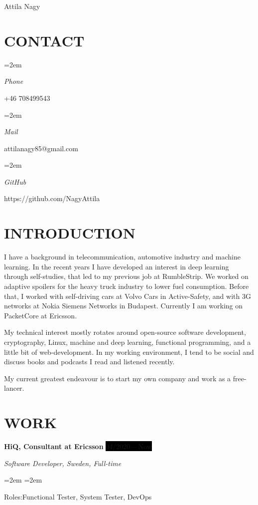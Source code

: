 \documentclass[paper=a4,fontsize=11pt]{scrartcl}	 			%
\newlength{\spacebox}
\newcommand{\MyName}[1]{
		\Huge \usefont{OT1}{phv}{b}{n} \hfill #1 		%
		\par \normalsize \normalfont}
\newcommand{\MySlogan}[1]{
		\large \usefont{OT1}{phv}{m}{n}\hfill \textit{#1} %
		\par \normalsize \normalfont}
\newcommand{\NewPart}[1]{\section*{\uppercase{#1}}}
\newcommand{\PersonalEntry}[2]{
		\noindent\hangindent=2em\hangafter=0 		%
		\parbox{\spacebox}{						%
		\textit{#1}}								%
		\hspace{1.5em} #2 \par}					%
\newcommand{\SkillsEntry}[2]{						%
		\noindent\hangindent=2em\hangafter=0 		%
		\parbox{\spacebox}{						%
		\textit{#1}}								%
		\hspace{1.5em} #2 \par}					%
\newcommand{\EducationEntry}[4]{
		\noindent \textbf{#1} \par 					%
		\noindent \textit{#3} \hfill					%
		\colorbox{Black}{%
			\hfill\color{White}#2} \par				%
		\noindent\hangindent=2em\hangafter=0 \small #4 	%
		\normalsize \par
    }
\newcommand{\WorkEntry}[4]{					        %
		\noindent \textbf{#1} \hfill 				%
		\colorbox{Black}{\color{White}#2} \par		%
		\noindent \textit{#3} \par					%
		\noindent\hangindent=2em\hangafter=0 \small #4 	%
		\normalsize \par}
\begin{document}
\MyName{Attila Nagy}

\NewPart{Contact}{}

\PersonalEntry{Phone}{+46 708499543}
\PersonalEntry{Mail}{attilanagy85@gmail.com}
\PersonalEntry{GitHub}{https://github.com/NagyAttila}

\NewPart{Introduction}{}

I have a background in telecommunication, automotive industry and machine learning. In the recent years I have developed an interest in deep learning through self-studies, that led to my previous job at RumbleStrip. We worked on adaptive spoilers for the heavy truck industry to lower fuel consumption. Before that, I worked with self-driving cars at Volvo Cars in Active-Safety, and with 3G networks at Nokia Siemens Networks in Budapest. Currently I am working on PacketCore at Ericsson.

My technical interest mostly rotates around open-source software development, cryptography, Linux, machine and deep learning, functional programming, and a little bit of web-development. In my working environment, I tend to be social and discuss books and podcasts I read and listened recently.

My current greatest endeavour is to start my own company and work as a free-lancer.


\NewPart{Work}{}

\WorkEntry{HiQ, Consultant at Ericsson}{04/2020 -- Now}{Software Developer, Sweden, Full-time}

\SkillsEntry{Roles:}{Functional Tester, System Tester, DevOps}
\end{document}
